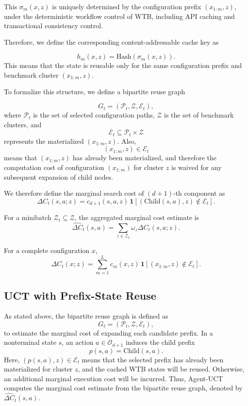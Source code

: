 \documentclass{article}
\begin{document}
This \(\sigma_m(x,z)\) is uniquely determined by the configuration prefix \((x_{1:m}, z)\), under the deterministic workflow control of WTB, including API caching and transactional consistency control.

Therefore, we define the corresponding content-addressable cache key as

\[
h_m(x,z) = \mathrm{Hash}(\sigma_m(x,z)).
\]
This means that the state is reusable only for the same configuration prefix and benchmark cluster \((x_{1:m}, z)\). 


To formalize this structure, we define a bipartite reuse graph

\[
G_t = (\mathcal P_t, \mathcal Z, \mathcal E_t),
\]
where \(\mathcal P_t\) is the set of selected configuration paths, \(\mathcal Z\) is the set of benchmark clusters, and
\[
\mathcal E_t \subseteq \mathcal P_t \times \mathcal Z
\]
represents the materialized \((x_{1:m}, z)\). Also, 
\[
(x_{1:m}, z) \in \mathcal E_t
\]
means that \((x_{1:m}, z)\) has already been materialized, and therefore the computation cost of configuration 
\((x_{1:m})\) for cluster \(z\) is waived for any subsequent expansion of child nodes.


We therefore define the marginal search cost of \((d+1)\)-th component as
\[
\Delta C_t(s,a;z)
=
c_{d+1}(s,a,z)\,
\mathbf 1\!\left[
(\mathrm{Child}(s,a), z)\notin \mathcal E_t
\right].
\]


For a minibatch \(\mathcal Z_t \subseteq \mathcal Z\), the aggregated marginal cost estimate is
\[
\widehat{\Delta C}_t(s,a)
=
\sum_{z \in \mathcal Z_t} \omega_z \Delta C_t(s,a;z).
\]


For a complete configuration \(x\), 
\[
\Delta C_t(x;z)
=
\sum_{m=1}^{L}
c_m(x,z)\,
\mathbf 1\!\left[
(x_{1:m}, z)\notin \mathcal E_t
\right].
\]


\subsection{UCT with Prefix-State Reuse}

As stated above, the bipartite reuse graph is defined as 
\[
G_t=(\mathcal P_t,\mathcal Z,\mathcal E_t),
\]
to estimate the marginal cost of expanding each candidate prefix. In a
nonterminal state \(s\), an action \(a\in\mathcal O_{d+1}\) induces the child
prefix
\[
p(s,a)=\mathrm{Child}(s,a).
\]
Here,  \((p(s,a),z)\in\mathcal E_t\) means that the selected prefix has already been materialized 
for cluster \(z\), and the cached WTB states will be reused.
Otherwise, an additional marginal execution cost will be incurred. Thus, Agent-UCT computes the marginal cost estimate from the bipartite reuse graph, denoted by 
\(\widehat{\Delta C}_t(s,a)\).
\end{document}
